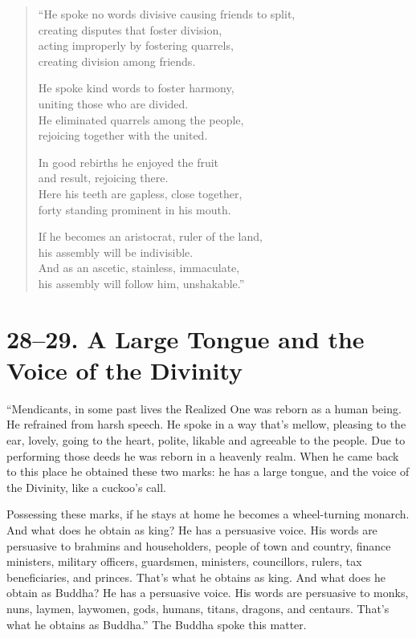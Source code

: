 \documentclass[12pt,openany]{book}%
\begin{document}
\begin{verse}%
“He spoke no words divisive causing friends to split, \\
creating disputes that foster division, \\
acting improperly by fostering quarrels, \\
creating division among friends. 

He spoke kind words to foster harmony, \\
uniting those who are divided. \\
He eliminated quarrels among the people, \\
rejoicing together with the united. 

In good rebirths he enjoyed the fruit \\
and result, rejoicing there. \\
Here his teeth are gapless, close together, \\
forty standing prominent in his mouth. 

If he becomes an aristocrat, ruler of the land, \\
his assembly will be indivisible. \\
And as an ascetic, stainless, immaculate, \\
his assembly will follow him, unshakable.” 

%
\end{verse}

\section*{28–29. A Large Tongue and the Voice of the Divinity }

“Mendicants, in some past lives the Realized One was reborn as a human being. He refrained from harsh speech. He spoke in a way that’s mellow, pleasing to the ear, lovely, going to the heart, polite, likable and agreeable to the people. Due to performing those deeds he was reborn in a heavenly realm. When he came back to this place he obtained these two marks: he has a large tongue, and the voice of the Divinity, like a cuckoo’s call. 

Possessing these marks, if he stays at home he becomes a wheel-turning monarch. And what does he obtain as king? He has a persuasive voice. His words are persuasive to brahmins and householders, people of town and country, finance ministers, military officers, guardsmen, ministers, councillors, rulers, tax beneficiaries, and princes. That’s what he obtains as king. And what does he obtain as Buddha? He has a persuasive voice. His words are persuasive to monks, nuns, laymen, laywomen, gods, humans, titans, dragons, and centaurs. That’s what he obtains as Buddha.” The Buddha spoke this matter. 
\end{document}
